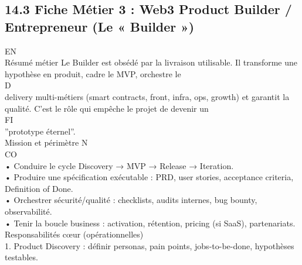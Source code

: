\subsection{14.3 Fiche Métier 3 : Web3 Product Builder / Entrepreneur (Le « Builder »)}
\vspace{0.5em}
\vspace{0.5em}
\vspace{0.5em}
\vspace{0.5em}
EN\\
Résumé métier Le Builder est obsédé par la livraison utilisable. Il transforme une hypothèse en produit, cadre le MVP, orchestre le\\
\vspace{0.5em}
\vspace{0.5em}
\vspace{0.5em}
\vspace{0.5em}
D\\
delivery multi-métiers (smart contracts, front, infra, ops, growth) et garantit la qualité. C’est le rôle qui empêche le projet de devenir un\\
\vspace{0.5em}
\vspace{0.5em}
\vspace{0.5em}
\vspace{0.5em}
FI\\
”prototype éternel”.\\
\vspace{0.5em}
Mission et périmètre                                N\\
CO\\
• Conduire le cycle Discovery → MVP → Release → Iteration.\\
\vspace{0.5em}
• Produire une spécification exécutable : PRD, user stories, acceptance criteria, Definition of Done.\\
\vspace{0.5em}
• Orchestrer sécurité/qualité : checklists, audits internes, bug bounty, observabilité.\\
\vspace{0.5em}
• Tenir la boucle business : activation, rétention, pricing (si SaaS), partenariats.\\
\vspace{0.5em}
Responsabilités cœur (opérationnelles)\\
\vspace{0.5em}
1. Product Discovery : définir personas, pain points, jobs-to-be-done, hypothèses testables.\\
